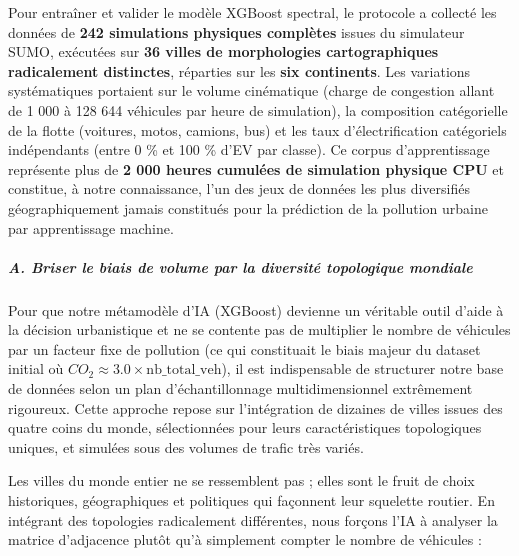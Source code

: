 \documentclass[10pt, a4paper]{article}
\begin{document}
Pour entraîner et valider le modèle XGBoost spectral, le protocole a
collecté les données de \textbf{242 simulations physiques complètes}
issues du simulateur SUMO, exécutées sur \textbf{36 villes de
morphologies cartographiques radicalement distinctes}, réparties sur les
\textbf{six continents}. Les variations systématiques portaient sur le
volume cinématique (charge de congestion allant de 1 000 à 128 644
véhicules par heure de simulation), la composition catégorielle de la
flotte (voitures, motos, camions, bus) et les taux d'électrification
catégoriels indépendants (entre 0 \% et 100 \% d'EV par classe). Ce
corpus d'apprentissage représente plus de \textbf{2 000 heures cumulées
de simulation physique CPU} et constitue, à notre connaissance, l'un des
jeux de données les plus diversifiés géographiquement jamais constitués
pour la prédiction de la pollution urbaine par apprentissage machine.

\subparagraph{A. Briser le biais de volume par la diversité topologique
mondiale}\label{a.-briser-le-biais-de-volume-par-la-diversituxe9-topologique-mondiale}

Pour que notre métamodèle d'IA (XGBoost) devienne un véritable outil
d'aide à la décision urbanistique et ne se contente pas de multiplier le
nombre de véhicules par un facteur fixe de pollution (ce qui constituait
le biais majeur du dataset initial où
\(CO_2 \approx 3.0 \times \text{nb\_total\_veh}\)), il est indispensable
de structurer notre base de données selon un plan d'échantillonnage
multidimensionnel extrêmement rigoureux. Cette approche repose sur
l'intégration de dizaines de villes issues des quatre coins du monde,
sélectionnées pour leurs caractéristiques topologiques uniques, et
simulées sous des volumes de trafic très variés.

Les villes du monde entier ne se ressemblent pas ; elles sont le fruit
de choix historiques, géographiques et politiques qui façonnent leur
squelette routier. En intégrant des topologies radicalement différentes,
nous forçons l'IA à analyser la matrice d'adjacence plutôt qu'à
simplement compter le nombre de véhicules :
\end{document}
